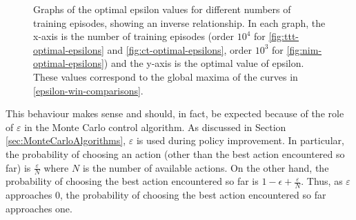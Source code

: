 \documentclass[11pt,a4paper,twoside,openright]{report}
\begin{document}
\begin{figure}[htbp]
    \centering
	\caption{Graphs of the optimal epsilon values for different numbers of training episodes, showing an inverse relationship. In each graph, the x-axis is the number of training episodes (order $10^4$ for \ref{fig:ttt-optimal-epsilons} and \ref{fig:ct-optimal-epsilons}, order $10^3$ for \ref{fig:nim-optimal-epsilons}) and the y-axis is the optimal value of epsilon. These values correspond to the global maxima of the curves in \ref{epsilon-win-comparisons}. }
	\label{training-vs-opt-epsilon}
\end{figure}


This behaviour makes sense and should, in fact, be expected because of the role of $\varepsilon$ in the Monte Carlo control algorithm. As discussed in Section \ref{sec:MonteCarloAlgorithms}, $\varepsilon$ is used during policy improvement. In particular, the probability of choosing an action (other than the best action encountered so far) is $\frac{\varepsilon}{N}$ where $N$ is the number of available actions. On the other hand, the probability of choosing the best action encountered so far is  $1 - \epsilon + \frac{\varepsilon}{N}$. Thus, as $\varepsilon$ approaches 0, the probability of choosing the best action encountered so far approaches one.
\end{document}
